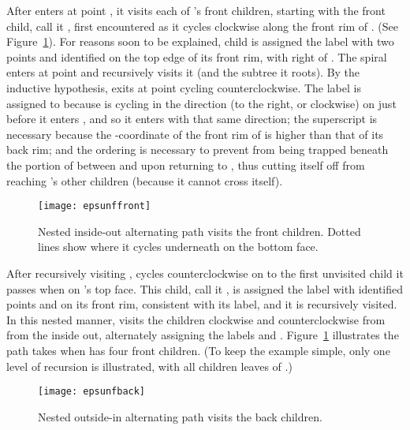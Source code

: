 \documentclass[11pt]{article}
\begin{document}
After  enters  at point ,
it visits each of
's front children,
starting with the front child, call it ,
first encountered as it cycles clockwise along the front rim of .
(See Figure~\ref{fig:epsfrontchildren}).
For reasons soon to be explained,
child  is assigned the label  with two points
 and  identified on the top edge of its front rim, with 
right of .
The spiral 
enters  at point  and recursively visits it (and the subtree
it roots).
By the inductive hypothesis,  exits  at point  cycling counterclockwise.
The label  is assigned to  because
 is cycling in the direction  (to the right, or clockwise)
on  just before it enters , and so it enters
 with that same direction; the  superscript is necessary
because the -coordinate of the front rim of  is higher than
that of its back rim; and the
 ordering is necessary to prevent  from being
trapped beneath the portion of  between  and  upon
returning to , thus cutting itself off from reaching 's other children
(because it cannot cross itself).


\begin{figure}[htbp]
\centering
\texttt{[image: epsunffront]}
\caption{Nested inside-out alternating path visits the front children. Dotted lines show 
where it cycles underneath on the bottom face.}
\label{fig:epsfrontchildren}
\end{figure}


After recursively visiting ,  cycles counterclockwise on 
to the first unvisited child it passes when on 's top face. This child, call it ,
is assigned the label  with identified points  and  on its front
rim, consistent with its label,  and it is recursively visited.
In this nested manner,  visits the
children clockwise and counterclockwise from  from the inside out,
alternately assigning the labels  and .
Figure~\ref{fig:epsfrontchildren} illustrates the path  takes
when  has four
front children. (To keep the example simple, only
one level of recursion is illustrated, with all children leaves of .)

\begin{figure}[htbp]
\centering
\texttt{[image: epsunfback]}
\caption{Nested outside-in alternating path visits the back children.}
\label{fig:epsbackchildren}
\end{figure}
\end{document}
